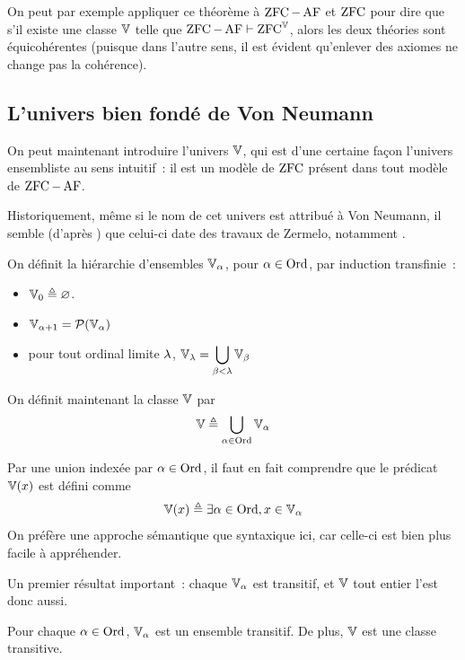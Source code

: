 On peut par exemple appliquer ce théorème à $\operatorname{ZFC} - \operatorname{AF}$ et $\operatorname{ZFC}$ pour dire
que s'il existe une classe $\mathbb V$ telle que
$\operatorname{ZFC} - \operatorname{AF}\vdash \operatorname{ZFC}^{\mathbb V}$, alors les deux théories sont équicohérentes
(puisque dans l'autre sens, il est évident qu'enlever des axiomes ne change pas
la cohérence).

\subsection{L'univers bien fondé de Von Neumann}

On peut maintenant introduire l'univers $\mathbb V$, qui est d'une certaine façon
l'univers ensembliste au sens intuitif~: il est un modèle de $\operatorname{ZFC}$ présent dans
tout modèle de $\operatorname{ZFC} - \operatorname{AF}$.

Historiquement, même si le nom de cet univers est attribué à Von Neumann,
il semble (d'après \cite{Moore1982}) que celui-ci date des travaux de 
Zermelo, notamment \cite{Zermelo1930}.

\begin{definition}
  On définit la hiérarchie d'ensembles $\mathbb V_{\alpha}$, pour $\alpha \in \operatorname{Ord}$,
  par induction transfinie~:
  \begin{itemize}
  \item $\mathbb V_0 \triangleq \varnothing$.
  \item $\mathbb V_{\alpha + 1} = \mathcal{P}(\mathbb V_{\alpha})$
  \item pour tout ordinal limite $\lambda$,
    $\displaystyle\mathbb V_\lambda = \bigcup_{\beta < \lambda}\mathbb V_\beta$
  \end{itemize}

  On définit maintenant la classe $\mathbb V$ par
  \[\mathbb V \triangleq \bigcup_{\alpha \in \operatorname{Ord}} \mathbb V_{\alpha}\]
\end{definition}

\begin{remark}
  Par une union indexée par $\alpha \in \operatorname{Ord}$, il faut en fait comprendre que le
  prédicat $\mathbb V(x)$ est défini comme
  \[\mathbb V(x) \triangleq \exists \alpha \in \operatorname{Ord}, x \in \mathbb V_{\alpha}\]
  On préfère une approche sémantique que syntaxique ici, car celle-ci est bien
  plus facile à appréhender.
\end{remark}

Un premier résultat important~: chaque $\mathbb V_{\alpha}$ est transitif, et $\mathbb V$ tout
entier l'est donc aussi.

\begin{property}
  Pour chaque $\alpha\in\operatorname{Ord}$, $\mathbb V_{\alpha}$ est un ensemble transitif. De plus, $\mathbb V$
  est une classe transitive.
\end{property}

